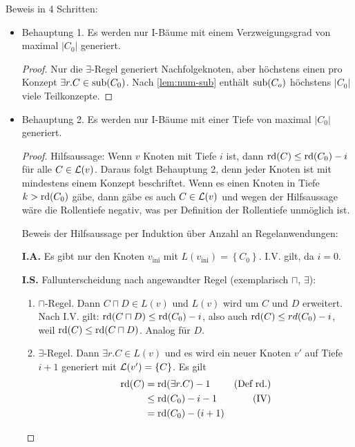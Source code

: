 Beweis in 4 Schritten:
\begin{itemize}
    \item Behauptung 1.
  Es werden nur I-Bäume mit einem Verzweigungsgrad
  von maximal $|C_0|$ generiert.
  \begin{tafel} \begin{proof}
        Nur die $\exists$-Regel generiert Nachfolgeknoten, aber
        höchstens einen pro Konzept $\exists r.C \in \operatorname{sub}(C_0)$. Nach
        \autoref{lem:num-sub}  enthält
        $\sub\left( C_{o} \right)$ höchstens $\left| C_{0} \right|$
        viele Teilkonzepte.
    \end{proof}\end{tafel}
\item Behauptung 2.
  Es werden nur I-Bäume mit einer Tiefe von maximal $\left| C_{0} \right|$
  generiert.
    \begin{tafel} \begin{proof}
        Hilfsaussage: Wenn $v$ Knoten mit Tiefe $i$ ist, dann $\operatorname{rd}(C) \leq \operatorname{rd}(C_0) - i$ für alle $C \in \mathcal{L}(v)$. Daraus folgt Behauptung 2, denn jeder Knoten ist mit mindestens einem Konzept beschriftet. Wenn es einen Knoten in Tiefe $k > \operatorname{rd}(C_0)$ gäbe, dann gäbe es auch $C\in \mathcal{L}(v)$ und wegen der Hilfsaussage wäre die Rollentiefe negativ, was per Definition der Rollentiefe unmöglich ist.

        Beweis der Hilfsaussage per Induktion über Anzahl an Regelanwendungen:

        \textbf{I.A.} Es gibt nur den Knoten $v_{\text{ini}}$ mit
$L\left( v_{\text{ini}} \right) = \left\{ C_{0} \right\}$. I.V. gilt,
da $i = 0$.

\textbf{I.S.} Fallunterscheidung nach angewandter Regel (exemplarisch
$\sqcap$, $\exists$):

\begin{enumerate}
\item $\sqcap$-Regel. Dann $C \sqcap D \in L(v)$ und $L(v)$ wird um $C$ und $D$ erweitert.
Nach I.V. gilt: $\rd\left( C \sqcap D \right) \leq \rd\left( C_{0} \right) - i$,
also auch $\rd\left( C \right) \leq rd\left( C_{0} \right) - i$,
weil $\rd\left( C \right) \leq \rd\left( C \sqcap D \right)$.
Analog für $D$.

\item $\exists$-Regel. Dann $\exists r.C \in L\left( v \right)$ und es wird
    ein neuer Knoten $v'$ auf Tiefe $i + 1$ generiert mit
$\ML\left( v' \right) = \left\{ C \right\}$. Es gilt
\begin{align*}
    \rd\left( C \right) &= \rd\left( \exists r.C \right) - 1 & \text{(Def rd.)}\\
                        &\leq \rd\left( C_{0} \right) - i - 1 & \text{(IV)}\\
                        &= \rd\left( C_{0} \right) - (i + 1)
\end{align*} \end{enumerate} \end{proof}
\end{tafel}


\end{itemize}
